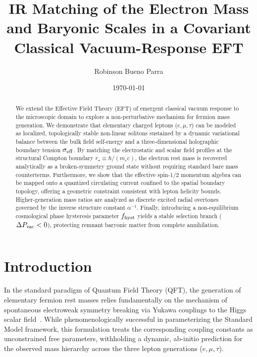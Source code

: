 \documentclass[
  reprint,
  aps,
  prd,
  twocolumn,
  superscriptaddress,
  nofootinbib,
  floatfix
]{revtex4-2}
\begin{document}
\title{IR Matching of the Electron Mass and Baryonic 
Scales in a Covariant Classical Vacuum-Response EFT}

\author{Robinson Bueno Parra}

\date{\today}

\begin{abstract}



We extend the Effective Field Theory (EFT) of emergent 
classical vacuum response to the microscopic domain to 
explore a non-perturbative mechanism for fermion mass 
generation. We demonstrate that elementary charged leptons 
($e, \mu, \tau$) can be modeled as localized, 
topologically stable non-linear solitons sustained by a 
dynamic variational balance between the bulk field self-energy 
and a three-dimensional holographic boundary tension $\sigma_{\rm eff}$. 
By matching the electrostatic and scalar field profiles at 
the structural Compton boundary $r_\star \equiv \hbar/(m_e c)$, 
the electron rest mass is recovered analytically as a 
broken-symmetry ground state without requiring standard bare 
mass counterterms. Furthermore, we show that 
the effective spin-$1/2$ momentum algebra can be mapped 
onto a quantized circulating current confined to the 
spatial boundary topology, offering a geometric constraint 
consistent with lepton helicity bounds. 
Higher-generation mass ratios are analyzed as discrete 
excited radial overtones governed by the inverse structure 
constant $\alpha^{-1}$. Finally, introducing a non-equilibrium 
cosmological phase hysteresis parameter $f_{\rm hyst}$ yields 
a stable selection branch ($\Delta P_{\rm vac} < 0$), protecting 
remnant baryonic matter from complete annihilation.
\end{abstract}


\maketitle
\section{Introduction}
\label{sec:introduction}

In the standard paradigm of Quantum Field Theory (QFT), 
the generation of elementary fermion rest masses relies 
fundamentally on the mechanism of spontaneous electroweak 
symmetry breaking via Yukawa couplings to the Higgs scalar 
field~\cite{Weinberg1967}. While phenomenologically 
successful in parameterizing the Standard Model framework, 
this formulation treats the corresponding coupling constants 
as unconstrained free parameters, withholding a dynamic, 
ab-initio prediction for the observed mass hierarchy 
across the three lepton generations ($e, \mu, \tau$).
\end{document}

